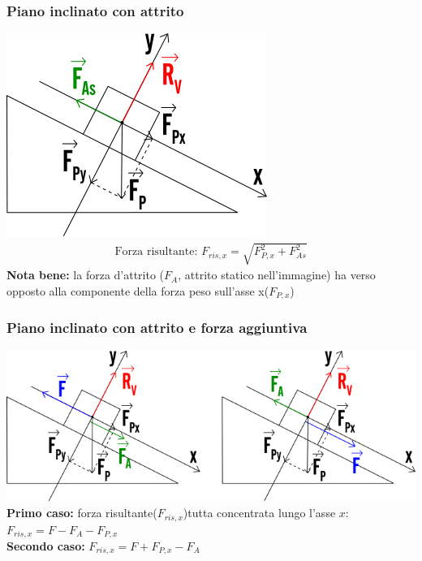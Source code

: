 \subsubsection{Piano inclinato con attrito}
\includegraphics[width=0.75 \linewidth]{Dinamica/piano-inclinato-con-attrito.png} \\
\begin{gather*}
    \text{Forza risultante: } F_{ris, x} = \sqrt{F_{P, x}^2 + F_{As}^2}
\end{gather*}
\textbf{Nota bene: } la forza d'attrito ($F_{A}$, attrito statico nell'immagine) ha verso opposto alla componente della forza peso sull'asse x($F_{P, x}$)
\subsubsection{Piano inclinato con attrito e forza aggiuntiva}
\includegraphics[width=\linewidth]{Dinamica/piano-inclinato-con-attrito-2.png} \\
\textbf{Primo caso: } forza risultante($F_{ris, x}$)tutta concentrata lungo l'asse $x$: $F_{ris, x} = F - F_A - F_{P, x}$ \\
\textbf{Secondo caso: } $F_{ris, x} = F + F_{P, x} - F_A$ \\

